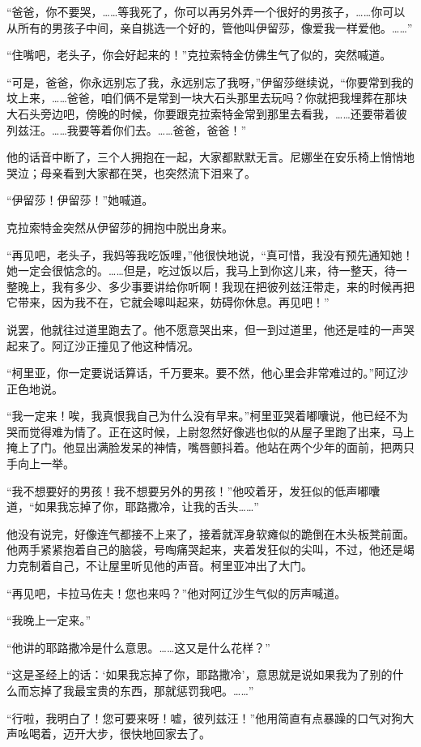 \par “爸爸，你不要哭，……等我死了，你可以再另外弄一个很好的男孩子，……你可以从所有的男孩子中间，亲自挑选一个好的，管他叫伊留莎，像爱我一样爱他。……”
\par “住嘴吧，老头子，你会好起来的！”克拉索特金仿佛生气了似的，突然喊道。
\par “可是，爸爸，你永远别忘了我，永远别忘了我呀，”伊留莎继续说，“你要常到我的坟上来，……爸爸，咱们俩不是常到一块大石头那里去玩吗？你就把我埋葬在那块大石头旁边吧，傍晚的时候，你要跟克拉索特金常到那里去看我，……还要带着彼列兹汪。……我要等着你们去。……爸爸，爸爸！”
\par 他的话音中断了，三个人拥抱在一起，大家都默默无言。尼娜坐在安乐椅上悄悄地哭泣；母亲看到大家都在哭，也突然流下泪来了。
\par “伊留莎！伊留莎！”她喊道。
\par 克拉索特金突然从伊留莎的拥抱中脱出身来。
\par “再见吧，老头子，我妈等我吃饭哩，”他很快地说，“真可惜，我没有预先通知她！她一定会很惦念的。……但是，吃过饭以后，我马上到你这儿来，待一整天，待一整晚上，我有多少、多少事要讲给你听啊！我现在把彼列兹汪带走，来的时候再把它带来，因为我不在，它就会嗥叫起来，妨碍你休息。再见吧！”
\par 说罢，他就往过道里跑去了。他不愿意哭出来，但一到过道里，他还是哇的一声哭起来了。阿辽沙正撞见了他这种情况。
\par “柯里亚，你一定要说话算话，千万要来。要不然，他心里会非常难过的。”阿辽沙正色地说。
\par “我一定来！唉，我真恨我自己为什么没有早来。”柯里亚哭着嘟囔说，他已经不为哭而觉得难为情了。正在这时候，上尉忽然好像逃也似的从屋子里跑了出来，马上掩上了门。他显出满脸发呆的神情，嘴唇颤抖着。他站在两个少年的面前，把两只手向上一举。
\par “我不想要好的男孩！我不想要另外的男孩！”他咬着牙，发狂似的低声嘟囔道，“如果我忘掉了你，耶路撒冷，让我的舌头……”
\par 他没有说完，好像连气都接不上来了，接着就浑身软瘫似的跪倒在木头板凳前面。他两手紧紧抱着自己的脑袋，号啕痛哭起来，夹着发狂似的尖叫，不过，他还是竭力克制着自己，不让屋里听见他的声音。柯里亚冲出了大门。
\par “再见吧，卡拉马佐夫！您也来吗？”他对阿辽沙生气似的厉声喊道。
\par “我晚上一定来。”
\par “他讲的耶路撒冷是什么意思。……这又是什么花样？”
\par “这是圣经上的话：‘如果我忘掉了你，耶路撒冷’，意思就是说如果我为了别的什么而忘掉了我最宝贵的东西，那就惩罚我吧。……”
\par “行啦，我明白了！您可要来呀！嘘，彼列兹汪！”他用简直有点暴躁的口气对狗大声吆喝着，迈开大步，很快地回家去了。


